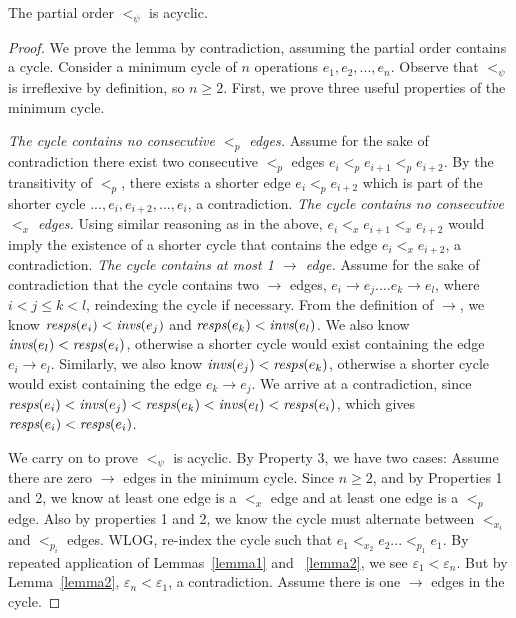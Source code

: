 \begin{lemma}
\label{lemmamain}
The partial order $<_\psi$ is acyclic.
\end{lemma}
\begin{proof}
We prove the lemma by contradiction, assuming the partial order contains a cycle. Consider a minimum cycle of $n$ operations $e_1,e_2,...,e_n$. Observe that $<_\psi$ is irreflexive by definition, so $n \geq 2$. First, we prove three useful properties of the minimum cycle.

 \textit{The cycle contains no consecutive $<_p$ edges.} {Assume for the sake of contradiction there exist two consecutive $<_p$ edges $e_i <_p e_{i+1} <_p e_{i+2}$. By the transitivity of $<_p$, there exists a shorter edge $e_i <_p e_{i+2}$ which is part of the shorter cycle $..., e_i, e_{i+2}, ..., e_i$, a contradiction.}
 \textit{The cycle contains no consecutive $<_x$ edges.} {Using similar reasoning as in the above, $e_i <_x e_{i+1} <_x e_{i+2}$ would imply the existence of a shorter cycle that contains the edge $e_i <_x e_{i+2}$, a contradiction.}
 \textit{The cycle contains at most 1 $\rightarrow$ edge.} Assume for the sake of contradiction that the cycle contains two $\rightarrow$ edges, $e_i \rightarrow e_j .... e_k \rightarrow e_l$, where $i < j \leq k < l$, reindexing the cycle if necessary. From the definition of $\rightarrow$, we know $\operatorname*{\textit{resps}}(e_i) < \operatorname*{\textit{invs}}(e_j)$ and $\operatorname*{\textit{resps}}(e_k) < \operatorname*{\textit{invs}}(e_l)$. We also know $\operatorname*{\textit{invs}}(e_l) < \operatorname*{\textit{resps}}(e_i)$, otherwise a shorter cycle would exist containing the edge $e_i \rightarrow e_l$. Similarly, we also know $\operatorname*{\textit{invs}}(e_j) < \operatorname*{\textit{resps}}(e_k)$, otherwise a shorter cycle would exist containing the edge $e_k \rightarrow e_j$. We arrive at a contradiction, since $\operatorname*{\textit{resps}}(e_i) < \operatorname*{\textit{invs}}(e_j) < \operatorname*{\textit{resps}}(e_k) < \operatorname*{\textit{invs}}(e_l) < \operatorname*{\textit{resps}}(e_i)$, which gives $\operatorname*{\textit{resps}}(e_i) < \operatorname*{\textit{resps}}(e_i)$.

We carry on to prove $<_\psi$ is acyclic. By Property 3, we have two cases:
 Assume there are zero $\rightarrow$ edges in the minimum cycle. Since $n \geq 2$, and by Properties 1 and 2, we know at least one edge is a $<_x$ edge and at least one edge is a $<_p$ edge. Also by properties 1 and 2, we know the cycle must alternate between $<_{x_i}$ and $<_{p_i}$ edges. WLOG, re-index the cycle such that $e_1 <_{x_2} e_2 ... <_{p_1} e_1$.
By repeated application of Lemmas~\ref{lemma1} and ~\ref{lemma2}, we see $\varepsilon_1 < \varepsilon_n$. But by Lemma~\ref{lemma2}, $\varepsilon_n < \varepsilon_1$, a contradiction.
 Assume there is one $\rightarrow$ edges in the cycle.

\end{proof}